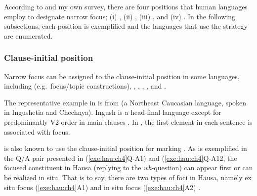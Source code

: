 According to \citet{fery:krifka:08} and my own survey, there are four
positions that human languages employ to designate narrow focus; (i)
, (ii) , (iii) ,
and (iv) . In the following subsections, each position
is exemplified and the languages that use the strategy are enumerated.


\subsubsection{Clause-initial position}
\label{4:sssec:clause-initial}


Narrow focus can be assigned to the clause-initial position in some
languages, including  (e.g.\ focus/topic 
constructions),  \citep{nichols:11},
 \citep{drubig:03},  \citep{press:86},
 \citep{jacobs:05}, and 
\citep{hartmann:zimmermann:07,buring:10}.



The representative example in  is from
 (a Northeast Caucasian language, spoken in Ingushetia and
Chechnya).  Ingush is a head-final language except for predominantly
V2 order in main clauses \citep{nichols:11}. In ,
the first element in each sentence is associated with focus.



 is also known to use the clause-initial position for
marking  \citep{buring:10}. As is exemplified in the Q/A pair
presented in (\ref{exe:hau:ch4}Q-A1) and (\ref{exe:hau:ch4}Q-A12, the
focused constituent in Hausa (replying to the \textit{wh}-question)
can appear first or can be realized in situ.  That is to say,
there are two types of foci in Hausa, namely ex situ focus
(\ref{exe:hau:ch4}A1) and in situ focus (\ref{exe:hau:ch4}A2)
\citep{hartmann:zimmermann:07}.

